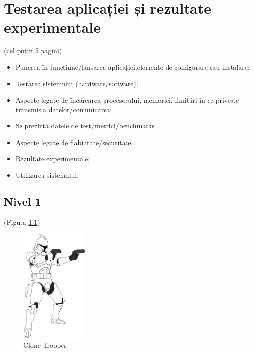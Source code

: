 \chapter{Testarea aplicației și rezultate experimentale}
\label{cap:cap4}

(cel puțin 5 pagini)

\begin{itemize}
    \item Punerea în funcțiune/lansarea aplicației,elemente de configurare sau instalare;
    \item Testarea sistemului (hardware/software);
    \item Aspecte legate de încărcarea procesorului, memoriei, limitări în ce privește transmisia datelor/comunicarea;
    \item Se prezintă datele de test/metrici/benchmarks
    \item Aspecte legate de fiabilitate/securitate;
    \item Rezultate experimentale;
    \item Utilizarea sistemului. 
\end{itemize}

\vspace{2cm}

\section{Nivel 1}
\label{cap:cap4:nivel1}

\textcolor{gray}{\lipsum}  (Figura \ref{fig:clone_trooper})

\begin{figure}[H]
    \centering
    \includegraphics[width=0.3\textwidth]{continut/capitol4/figuri/clone_trooper.png}
    \caption{Clone Trooper\protect\footnotemark}
    \label{fig:clone_trooper}
\end{figure}


